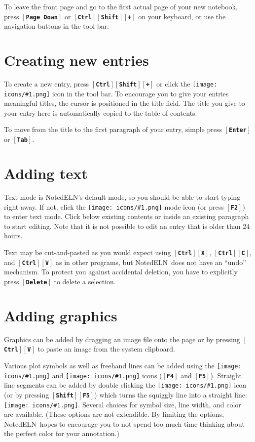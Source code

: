 \documentclass[11pt]{report}
\def\keystroke#1{$\left[\right.\!${\tt\bfseries #1}$\!\left.\right]$}
\def\key#1{\keystroke{#1}}
\def\keycombo#1#2{\keystroke{#1}\keystroke{#2}}
\def\keycontrol#1{\keycombo{Ctrl}{#1}}
\def\keyshift#1{\keycombo{Shift}{#1}}
\def\controlshift#1{\keystroke{Ctrl}\keystroke{Shift}\keystroke{#1}}
\def\icon#1{\raise-2pt\hbox{\texttt{[image: icons/\#1.png]}}}
\newcommand{\NotedELN}{NotedELN} %
\begin{document}
To leave the front page and go to the first actual page of your new
notebook, press \key{Page Down} or \controlshift{+} on your keyboard,
or use the navigation buttons in the tool bar.

\section{Creating new entries}

To create a new entry, press \controlshift{+} or click the
\icon{nav-plus} icon in the tool bar. To encourage you to give
your entries meaningful titles, the cursor is positioned in the title
field. The title you give to your
entry here is automatically copied to the table of contents.

To move from the title to the first paragraph of your entry, simple
press \key{Enter} or \key{Tab}.

\section{Adding text}

Text mode is \NotedELN's default mode, so you should be able to start typing
right away. If not, click the \icon{type} mode icon (or press
\key{F2}) to enter text mode. Click below existing contents or inside
an existing paragraph to start editing. Note that it is not possible
to edit an entry that is older than 24 hours.

Text may be cut-and-pasted as you would expect using
\keycontrol{X}, \keycontrol{C}, and \keycontrol{V} as in other
programs, but \NotedELN\ does not have an ``undo'' mechanism. To protect
you against accidental deletion, you have to explicitly press
\key{Delete} to delete a selection.

\section{Adding graphics}

Graphics can be added by dragging an image file onto the page or by
pressing \keycontrol{V} to paste an image from the system
clipboard.

Various plot symbols as well as freehand lines can be added using the
\icon{mark} and \icon{squiggle} icons (\key{F4} and
\key{F5}). Straight line segments can be added by double clicking the
\icon{squiggle} icon (or by pressing \keyshift{F5}) which turns the
squiggly line into a straight line: \icon{straight}. Several choices
for symbol size, line width, and color are available.  (These options
are not extendible. By limiting the options, \NotedELN\ hopes to encourage
you to not spend too much time thinking about the perfect color for
your annotation.)
\end{document}
